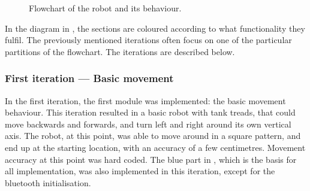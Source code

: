 \begin{figure}[H]
     \caption{\label{fig:CompleteRobotFlowchart} Flowchart of the robot and its behaviour.}
\end{figure}

In the diagram in , the sections are coloured according to what functionality they fulfil. The previously mentioned iterations often focus on one of the particular partitions of the flowchart. The iterations are described below.


\subsubsection{First iteration --- Basic movement}
In the first iteration, the first module was implemented: the basic movement behaviour. This iteration resulted in a basic robot with tank treads, that could move backwards and forwards, and turn left and right around its own vertical axis. The robot, at this point, was able to move around in a square pattern, and end up at the starting location, with an accuracy of a few centimetres. Movement accuracy at this point was hard coded. The blue part in , which is the basis for all implementation, was also implemented in this iteration, except for the bluetooth initialisation.


